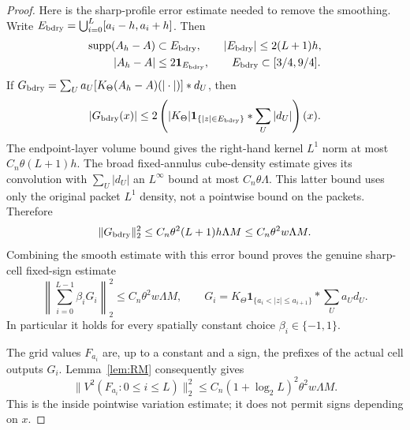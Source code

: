 \documentclass[11pt]{article}
\numberwithin{equation}{section}
\theoremstyle{remark}
\theoremstyle{definition}
\newcommand{\supp}{\operatorname{supp}}
\newcommand{\norm}[1]{\lVert #1\rVert}
\begin{document}
\begin{proof}
Here is the sharp-profile error estimate needed to remove the smoothing.
Write
$E_{\rm bdry}=\bigcup_{i=0}^{L}[a_i-h,a_i+h]$.  Then
\begin{align}
 \supp(A_h-A)&\subset E_{\rm bdry},\qquad
 |E_{\rm bdry}|\le2(L+1)h,
 \label{eq:terminal-boundary-profile-one}\\
 |A_h-A|&\le2\mathbf1_{E_{\rm bdry}},\qquad
 E_{\rm bdry}\subset[3/4,9/4].
 \label{eq:terminal-boundary-profile-high}
\end{align}
If $G_{\rm bdry}=\sum_Ua_U[K_\Theta(A_h-A)(|\cdot|)]*d_U$, then
\begin{equation}\label{eq:terminal-boundary-domination-one}
 |G_{\rm bdry}(x)|\le
 2\left(|K_\Theta|\mathbf1_{\{|z|\in E_{\rm bdry}\}}
               *\sum_U|d_U|\right)(x).
\end{equation}
The endpoint-layer volume bound gives the right-hand kernel $L^1$ norm
at most $C_n\theta(L+1)h$.  The broad fixed-annulus cube-density
estimate gives its convolution with $\sum_U|d_U|$ an $L^\infty$ bound
at most $C_n\theta\Lambda$.  This latter bound uses only the original
packet $L^1$ density, not a pointwise bound on the packets.  Therefore
\begin{equation}\label{eq:terminal-boundary-domination-high}
 \norm{G_{\rm bdry}}_2^2
 \le C_n\theta^2(L+1)h\Lambda M
 \le C_n\theta^2w\Lambda M.
\end{equation}
Combining the smooth estimate with this error bound proves the genuine
sharp-cell fixed-sign estimate
\[
 \left\|\sum_{i=0}^{L-1}\beta_i G_i\right\|_2^2
 \le C_n\theta^2w\Lambda M,\qquad
 G_i=K_\Theta\mathbf1_{\{a_i<|z|\le a_{i+1}\}}
                  *\sum_Ua_Ud_U.
\]
In particular it holds for every spatially constant choice
$\beta_i\in\{-1,1\}$.

The grid values $F_{a_i}$ are, up to a constant and a sign, the prefixes
of the actual cell outputs $G_i$.  Lemma~\ref{lem:RM} consequently gives
\begin{equation}\label{eq:terminal-RM-log-cost}
 \norm{V^2(F_{a_i}:0\le i\le L)}_2^2
 \le C_n(1+\log_2L)^2\theta^2w\Lambda M.
\end{equation}
This is the inside pointwise variation estimate; it does not permit
signs depending on $x$.


\end{proof}
\end{document}
